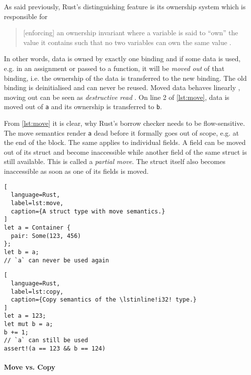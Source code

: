 As said previously, Rust's distinguishing feature is its ownership system which
is responsible for

\begin{quote}
{[enforcing]} an ownership invariant where a
variable is said to ``own'' the value it contains such that no two variables can
own the same value \cite[page 5]{lightweight-formalism}.
\end{quote}

In other words, data is owned by exactly one binding and if some data is used,
e.g. in an assignment or passed to a function, it will be \emph{moved out} of
that binding, i.e. the ownership of the data is transferred to the new binding.
The old binding is deinitialised and can never be reused. Moved data behaves
linearly \cite{oxide}, moving out can be seen as \emph{destructive read}
\cite{islands-alias-protection}. On line 2 of \autoref{lst:move}, data is moved
out of \lstinline!a! and its ownership is transferred to \lstinline!b!.

From \autoref{lst:move} it is clear, why Rust's borrow checker needs to be
flow-sensitive. The move semantics render \lstinline!a! dead before it formally
goes out of scope, e.g. at the end of the block. The same applies to individual
fields. A field can be moved out of its struct and become inaccessible while
another field of the same struct is still available. This is called a
\emph{partial move}. The struct itself also becomes inaccessible as soon as one
of its fields is moved.

\noindent\begin{minipage}[t]{.47\textwidth}
\begin{lstlisting}[
  language=Rust,
  label=lst:move,
  caption={A struct type with move semantics.}
]
let a = Container {
  pair: Some(123, 456)
};
let b = a;
// `a` can never be used again
\end{lstlisting}
\end{minipage}\hfill
\begin{minipage}[t]{.47\textwidth}
\begin{lstlisting}[
  language=Rust,
  label=lst:copy,
  caption={Copy semantics of the \lstinline!i32! type.}
]
let a = 123;
let mut b = a;
b += 1;
// `a` can still be used
assert!(a == 123 && b == 124)
\end{lstlisting}
\end{minipage}

\paragraph{Move vs. Copy}

